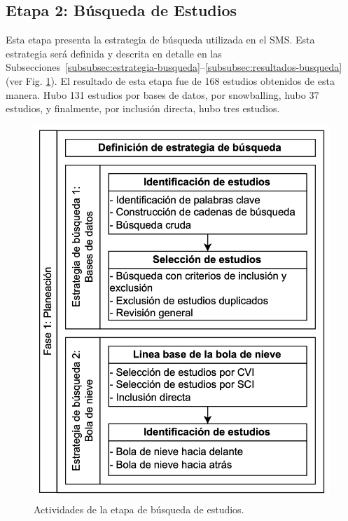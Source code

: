 \subsection{Etapa 2: Búsqueda de Estudios}

Esta etapa presenta la estrategia de búsqueda utilizada en el SMS\@. Esta estrategia será definida y descrita en detalle en las Subsecciones~\ref{subsubsec:estrategia-busqueda}--\ref{subsubsec:resultados-busqueda} (ver Fig. \ref{fig:busqueda-estudios}).
El resultado de esta etapa fue de 168 estudios obtenidos de esta manera. Hubo 131 estudios por bases de datos, por snowballing, hubo 37 estudios, y finalmente, por inclusión directa, hubo tres estudios.


\begin{figure}[htbp]
	\centering
	\vspace{10pt}
	\includegraphics[scale=0.3]{resources/figures/fig03-fase1-planeacion.png}
	\vspace{6pt}
	\caption{Actividades de la etapa de búsqueda de estudios.}
	\label{fig:busqueda-estudios}
\end{figure}

